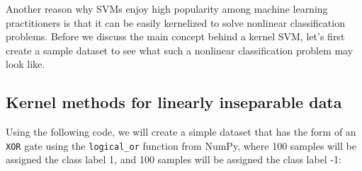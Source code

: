\documentclass[11pt]{article}
\begin{document}
Another reason why SVMs enjoy high popularity among machine learning
practitioners is that it can be easily kernelized to solve nonlinear
classification problems. Before we discuss the main concept behind a
kernel SVM, let's first create a sample dataset to see what such a
nonlinear classification problem may look like.

    \subsection{Kernel methods for linearly inseparable
data}\label{kernel-methods-for-linearly-inseparable-data}

Using the following code, we will create a simple dataset that has the
form of an \texttt{XOR} gate using the \texttt{logical\_or} function
from NumPy, where 100 samples will be assigned the class label 1, and
100 samples will be assigned the class label -1:
\end{document}
